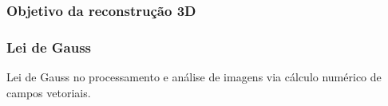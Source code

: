 \begin{frame}
  \frametitle{Objetivo da reconstrução 3D}
  \frametitle{Lei de Gauss}

\begin{alertblock}{\cite{da1999gauss}}
  Lei de Gauss no processamento e análise de imagens via cálculo numérico
  de campos vetoriais.
\end{alertblock}
\end{frame}


